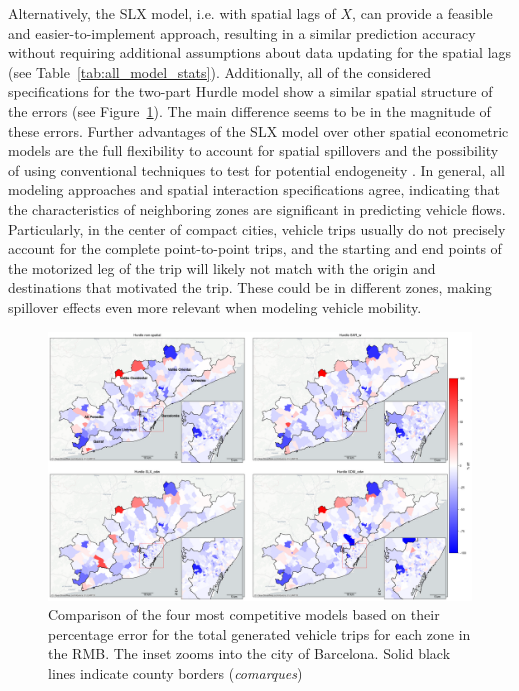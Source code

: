Alternatively, the SLX model, i.e. with spatial lags of $X$,  can provide a feasible and easier-to-implement approach, resulting in a similar prediction accuracy without requiring additional assumptions about data updating for the spatial lags (see Table~\ref{tab:all_model_stats}). Additionally, all of the considered specifications for the two-part Hurdle model show a similar spatial structure of the errors (see Figure~\ref{fig:maps_4models_perfectage_error_generated}). The main difference seems to be in the magnitude of these errors. Further advantages of the SLX model over other spatial econometric models are the full flexibility to account for spatial spillovers and the possibility of using conventional techniques to test for potential endogeneity \citep{Elhorst2022TheBar}. In general, all modeling approaches and spatial interaction specifications agree, indicating that the characteristics of neighboring zones are significant in predicting vehicle flows. 
Particularly, in the center of compact cities, vehicle trips usually do not precisely account for the complete point-to-point trips, and the starting and end points of the motorized leg of the trip will likely not match with the origin and destinations that motivated the trip. These could be in different zones, making spillover effects even more relevant when modeling vehicle mobility.

\begin{figure}[h!]
    \centering
    \includegraphics[width=1\textwidth]{fig_generated_perc_diff_SDM_v4.png}
    \caption{Comparison of the four most competitive models based on their percentage error for the total generated vehicle trips for each zone in the RMB. The inset zooms into the city of Barcelona. Solid black lines indicate county borders (\textit{comarques})}
    \label{fig:maps_4models_perfectage_error_generated}
\end{figure}

